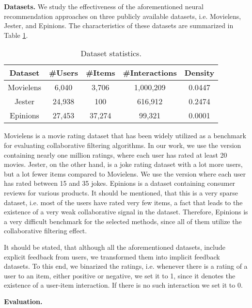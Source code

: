 
\textbf{Datasets.}
We study the effectiveness of the aforementioned neural recommendation approaches on three publicly available datasets, i.e. Movielens, Jester, and Epinions. 
The characteristics of these datasets are summarized in Table \ref{tab:datasets}.

\begin{table}[h]
    \centering
    \begin{tabular}{c|c|c|c|c}
        \hline
        Dataset & \#Users & \#Items & \#Interactions & Density \\
        \hline
        Movielens &  6,040 &  3,706 & 1,000,209 & 0.0447 \\
        Jester    & 24,938 &    100 &   616,912 & 0.2474 \\
        Epinions  & 27,453 & 37,274 &    99,321 & 0.0001
    \end{tabular}
    \caption{Dataset statistics.}
    \label{tab:datasets}
\end{table}

Movielens is a movie rating dataset that has been widely utilized as a benchmark for evaluating collaborative filtering algorithms.
In our work, we use the version containing nearly one million ratings, where each user has rated at least 20 movies.
Jester, on the other hand, is a joke rating dataset with a lot more users, but a lot fewer items compared to Movielens.
We use the version where each user has rated between 15 and 35 jokes.
Epinions is a dataset containing consumer reviews for various products. 
It should be mentioned, that this is a very sparse dataset, i.e. most of the users have rated very few items, a fact that leads to the existence of a very weak collaborative signal in the dataset. 
Therefore, Epinions is a very difficult benchmark for the selected methods, since all of them utilize the collaborative filtering effect.

It should be stated, that although all the aforementioned datasets, include explicit feedback from users, we transformed them into implicit feedback datasets.
To this end, we binarized the ratings, i.e. whenever there is a rating of a user to an item, either positive or negative, we set it to 1, since it denotes the existence of a user-item interaction. 
If there is no such interaction we set it to 0.

\textbf{Evaluation.}
